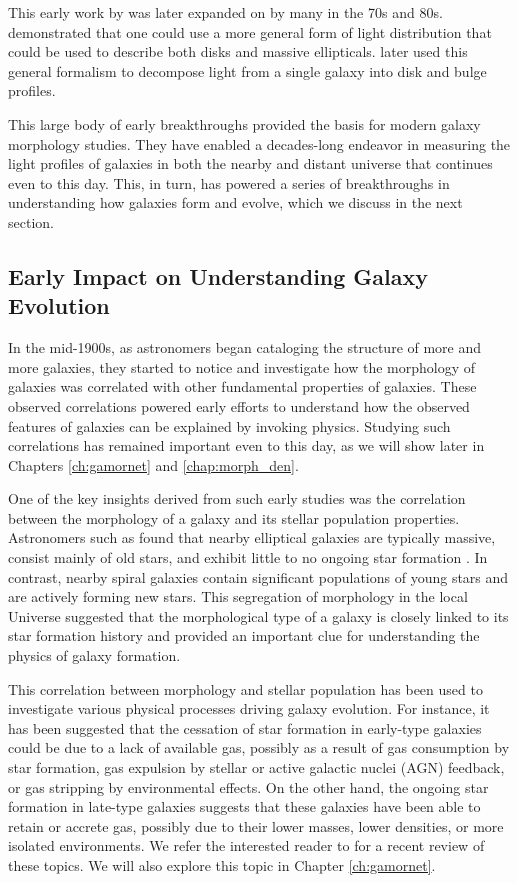 This early work by \citeauthor{de_vac_48} was later expanded on by many in the 70s and 80s. \citet{sersic_63} demonstrated that one could use a more general form of light distribution that could be used to describe both disks and massive ellipticals. \citet{kormendy_77} later used this general formalism to decompose light from a single galaxy into disk and bulge profiles. 

This large body of early breakthroughs provided the basis for modern galaxy morphology studies. They have enabled a decades-long endeavor in measuring the light profiles of galaxies in both the nearby and distant universe that continues even to this day. This, in turn, has powered a series of breakthroughs in understanding how galaxies form and evolve, which we discuss in the next section. 

\subsection{Early Impact on Understanding Galaxy Evolution} \label{sec_intro:gal_evo}
In the mid-1900s, as astronomers began cataloging the structure of more and more galaxies, they started to notice and investigate how the morphology of galaxies was correlated with other fundamental properties of galaxies. These observed correlations powered early efforts to understand how the observed features of galaxies can be explained by invoking physics. Studying such correlations has remained important even to this day, as we will show later in Chapters \ref{ch:gamornet} and \ref{chap:morph_den}.

One of the key insights derived from such early studies was the correlation between the morphology of a galaxy and its stellar population properties. Astronomers such as \citeauthor{holmberg_58} found that nearby elliptical galaxies are typically massive, consist mainly of old stars, and exhibit little to no ongoing star formation \citep{holmberg_58}. In contrast, nearby spiral galaxies contain significant populations of young stars and are actively forming new stars. This segregation of morphology in the local Universe  suggested that the morphological type of a galaxy is closely linked to its star formation history and provided an important clue for understanding the physics of galaxy formation.

This correlation between morphology and stellar population has been used to investigate various physical processes driving galaxy evolution. For instance, it has been suggested that the cessation of star formation in early-type galaxies could be due to a lack of available gas, possibly as a result of gas consumption by star formation, gas expulsion by stellar or active galactic nuclei (AGN) feedback, or gas stripping by environmental effects. On the other hand, the ongoing star formation in late-type galaxies suggests that these galaxies have been able to retain or accrete gas, possibly due to their lower masses, lower densities, or more isolated environments. We refer the interested reader to \citet{morph_review} for a recent review of these topics. We will also explore this topic in Chapter \ref{ch:gamornet}.

